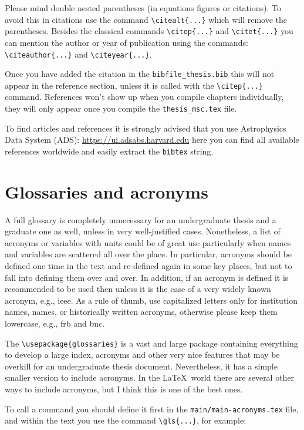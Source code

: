 Please mind double nested parentheses (in equations figures or citations). To avoid this in citations use the command \verb|\citealt{...}| which will remove the parentheses. Besides the classical commands \verb|\citep{...}| and \verb|\citet{...}| you can mention the author or year of publication using the commands: \verb|\citeauthor{...}| and \verb|\citeyear{...}|.

Once you have added the citation in the \texttt{bibfile\_thesis.bib} this will not appear in the reference section, unless it is called with the \verb|\citep{...}| command. References won't show up when you compile chapters individually, they will only appear once you compile the \texttt{thesis\_msc.tex} file.

To find articles and references it is strongly advised that you use Astrophysics Data System (ADS): \url{https://ui.adsabs.harvard.edu} here you can find all available references worldwide and easily extract the \texttt{bibtex} string.

\section{Glossaries and acronyms}
\label{sec:glossaries}

A full glossary is completely unnecessary for an undergraduate thesis and a graduate one as well, unless in very well-justified cases. Nonetheless, a list of acronyms or variables with units could be of great use particularly when names and variables are scattered all over the place. In particular, acronyms should be defined one time in the text and re-defined again in some key places, but not to fall into defining them over and over. In addition, if an acronym is defined it is recommended to be used then unless it is the case of a very widely known acronym, e.g., \gls{ieee}. As a rule of thumb, use capitalized letters only for institution names, names, or historically written acronyms, otherwise please keep them lowercase, e.g., \acrfull{frb} and \acrfull{bnc}.

The \verb|\usepackage{glossaries}| is a vast and large package containing everything to develop a large index, acronyms and other very nice features that may be overkill for an undergraduate thesis document. Nevertheless, it has a simple smaller version to include acronyms. In the \LaTeX\ world there are several other ways to include acronyms, but I think this is one of the best ones. 

To call a command you should define it first in the \texttt{main/main-acronyms.tex} file, and within the text you use the command \verb|\gls{...}|, for example:

